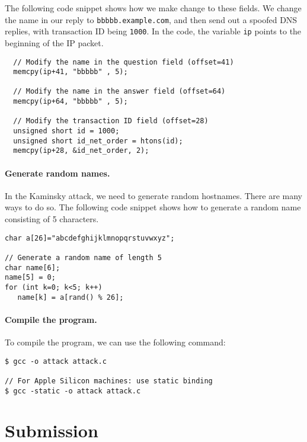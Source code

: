 The following code snippet shows how we make change to these fields. We change
the name in our reply to \texttt{bbbbb.example.com}, and then send out a
spoofed DNS replies, with transaction ID being \texttt{1000}.
In the code, the variable \texttt{ip} points to the beginning of the IP packet.  

\begin{lstlisting}
  // Modify the name in the question field (offset=41)
  memcpy(ip+41, "bbbbb" , 5);

  // Modify the name in the answer field (offset=64)
  memcpy(ip+64, "bbbbb" , 5);

  // Modify the transaction ID field (offset=28)
  unsigned short id = 1000;
  unsigned short id_net_order = htons(id);
  memcpy(ip+28, &id_net_order, 2);
\end{lstlisting}



\paragraph{Generate random names.} In the Kaminsky attack, we need to 
generate random hostnames. There are many ways to do so. The following 
code snippet shows how to generate a random name consisting of 
5 characters. 

\begin{lstlisting}
char a[26]="abcdefghijklmnopqrstuvwxyz";

// Generate a random name of length 5
char name[6];
name[5] = 0;
for (int k=0; k<5; k++)  
   name[k] = a[rand() % 26];
\end{lstlisting}
 

\paragraph{Compile the program.}
To compile the program, we can use the following command:

\begin{lstlisting}
$ gcc -o attack attack.c

// For Apple Silicon machines: use static binding 
$ gcc -static -o attack attack.c
\end{lstlisting}
 


\section{Submission}

